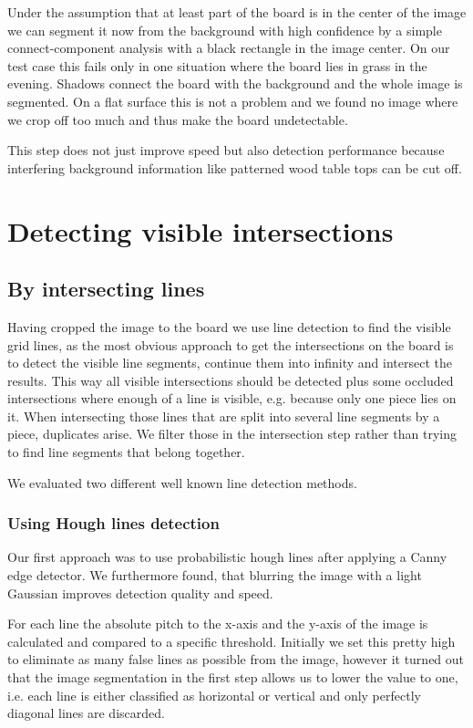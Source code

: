 	Under the assumption that at least part of the board is in the center of the image we can segment it now from the background with high confidence by a simple connect-component analysis with a black rectangle in the image center. On our test case this fails only in one situation where the board lies in grass in the evening. Shadows connect the board with the background and the whole image is segmented. On a flat surface this is not a problem and we found no image where we crop off too much and thus make the board undetectable.

	This step does not just improve speed but also detection performance because interfering background information like patterned wood table tops can be cut off.

	\section{Detecting visible intersections}
	\subsection{By intersecting lines}
	Having cropped the image to the board we use line detection to find the visible grid lines, as the most obvious approach to get the intersections on the board is to detect the visible line segments, continue them into infinity and intersect the results. This way all visible intersections should be detected plus some occluded intersections where enough of a line is visible, e.g. because only one piece lies on it. When intersecting those lines that are split into several line segments by a piece, duplicates arise. We filter those in the intersection step rather than trying to find line segments that belong together.

	We evaluated two different well known line detection methods.
	\subsubsection{Using Hough lines detection}
	\label{detector-visible-hough}
	Our first approach was to use probabilistic hough lines after applying a Canny edge detector. We furthermore found, that blurring the image with a light Gaussian improves detection quality and speed.

	For each line the absolute pitch to the x-axis and the y-axis of the image is calculated and compared to a specific threshold. Initially we set this pretty high to eliminate as many false lines as possible from the image, however it turned out that the image segmentation in the first step allows us to lower the value to one, i.e. each line is either classified as horizontal or vertical and only perfectly diagonal lines are discarded.

